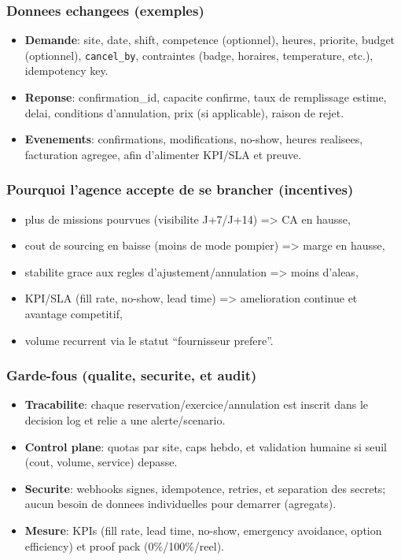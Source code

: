 \documentclass[11pt,a4paper]{article}
\begin{document}
\subsubsection*{Donnees echangees (exemples)}
\begin{itemize}
  \item \textbf{Demande}: site, date, shift, competence (optionnel), heures, priorite, budget (optionnel), \texttt{cancel\_by}, contraintes (badge, horaires, temperature, etc.), idempotency key.
  \item \textbf{Reponse}: confirmation\_id, capacite confirme, taux de remplissage estime, delai, conditions d'annulation, prix (si applicable), raison de rejet.
  \item \textbf{Evenements}: confirmations, modifications, no-show, heures realisees, facturation agregee, afin d'alimenter KPI/SLA et preuve.
\end{itemize}

\subsubsection*{Pourquoi l'agence accepte de se brancher (incentives)}
\begin{itemize}
  \item plus de missions pourvues (visibilite J+7/J+14) => CA en hausse,
  \item cout de sourcing en baisse (moins de mode pompier) => marge en hausse,
  \item stabilite grace aux regles d'ajustement/annulation => moins d'aleas,
  \item KPI/SLA (fill rate, no-show, lead time) => amelioration continue et avantage competitif,
  \item volume recurrent via le statut ``fournisseur prefere''.
\end{itemize}

\subsubsection*{Garde-fous (qualite, securite, et audit)}
\begin{itemize}
  \item \textbf{Tracabilite}: chaque reservation/exercice/annulation est inscrit dans le decision log et relie a une alerte/scenario.
  \item \textbf{Control plane}: quotas par site, caps hebdo, et validation humaine si seuil (cout, volume, service) depasse.
  \item \textbf{Securite}: webhooks signes, idempotence, retries, et separation des secrets; aucun besoin de donnees individuelles pour demarrer (agregats).
  \item \textbf{Mesure}: KPIs (fill rate, lead time, no-show, emergency avoidance, option efficiency) et proof pack (0\%/100\%/reel).
\end{itemize}
\end{document}
